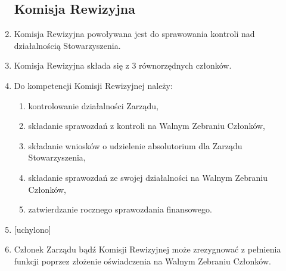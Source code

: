 \documentclass{article}
\begin{document}
\begin{enumerate}
    \subsection{Komisja Rewizyjna}
	    \item Komisja Rewizyjna powoływana jest do sprawowania kontroli nad działalnością Stowarzyszenia.
	    \item Komisja Rewizyjna składa się z 3 równorzędnych członków.
	    \item Do kompetencji Komisji Rewizyjnej należy:
	      \begin{enumerate}
	        \item kontrolowanie działalności Zarządu,
	        \item składanie sprawozdań z kontroli na Walnym Zebraniu Członków,
	        \item składanie wniosków o udzielenie absolutorium dla Zarządu Stowarzyszenia,
	        \item składanie sprawozdań ze swojej działalności na Walnym Zebraniu Członków,
	        \item zatwierdzanie rocznego sprawozdania finansowego.
	      \end{enumerate}
	    
	    \item {[uchylono]}
	    \item Członek Zarządu bądź Komisji Rewizyjnej może zrezygnować z pełnienia funkcji poprzez złożenie oświadczenia na Walnym Zebraniu Członków.
	  \end{enumerate}
\end{document}
